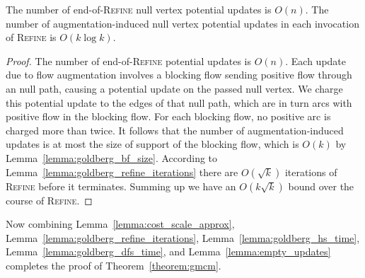 \documentclass[a4paper,UKenglish]{socg-lipics-v2018}
\def\polylog{\mathop{\mathrm{polylog}}}
\theoremstyle{plain}
\numberwithin{figure}{section}
\begin{document}
\begin{toappendix}
\begin{lemmarep}
\label{lemma:empty_updates}
The number of end-of-\textsc{Refine} null vertex potential updates is $O(n)$.
The number of augmentation-induced null vertex potential updates in each
invocation of \textsc{Refine} is $O(k\log k)$.
\end{lemmarep}

\begin{proof}
The number of end-of-\textsc{Refine} potential updates is $O(n)$.
Each update due to flow augmentation involves a blocking flow sending positive
flow through an null path, causing a potential update on the passed
null vertex.
We charge this potential update to the edges of that null path, which are in
turn arcs with positive flow in the blocking flow.
For each blocking flow, no positive arc is charged more than twice.
It follows that the number of augmentation-induced updates is at most the size of support of the blocking flow, which is $O(k)$
by Lemma~\ref{lemma:goldberg_bf_size}.
According to Lemma~\ref{lemma:goldberg_refine_iterations} there are $O(\sqrt{k})$ iterations of \textsc{Refine} before it terminates.
Summing up we have an $O(k\sqrt{k})$ bound over the course of \textsc{Refine}.
\end{proof}


%
Now combining Lemma~\ref{lemma:cost_scale_approx},
Lemma~\ref{lemma:goldberg_refine_iterations}, Lemma~\ref{lemma:goldberg_hs_time},
Lemma~\ref{lemma:goldberg_dfs_time}, and Lemma~\ref{lemma:empty_updates}
completes the proof of Theorem~\ref{theorem:gmcm}.

\end{toappendix}
\end{document}
